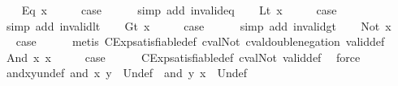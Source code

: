\begin{isabellebody}
\ \ \isamarkupfalse%
\ {\isacharparenleft}Eq\ x{\isacharparenright}\isanewline
\ \ \isamarkupfalse%
\ \isamarkupfalse%
\ {\isacharquery}case\isanewline
\ \ \ \ \isamarkupfalse%
\ {\isacharparenleft}simp\ add{\isacharcolon}\ invalid{\isacharunderscore}eq{\isacharparenright}\isanewline
{}\isamarkupfalse%
\isanewline
\ \ \isamarkupfalse%
\ {\isacharparenleft}Lt\ x{\isacharparenright}\isanewline
\ \ \isamarkupfalse%
\ \isamarkupfalse%
\ {\isacharquery}case\isanewline
\ \ \ \ \isamarkupfalse%
\ {\isacharparenleft}simp\ add{\isacharcolon}\ invalid{\isacharunderscore}lt{\isacharparenright}\isanewline
{}\isamarkupfalse%
\isanewline
\ \ \isamarkupfalse%
\ {\isacharparenleft}Gt\ x{\isacharparenright}\isanewline
\ \ \isamarkupfalse%
\ \isamarkupfalse%
\ {\isacharquery}case\isanewline
\ \ \ \ \isamarkupfalse%
\ {\isacharparenleft}simp\ add{\isacharcolon}\ invalid{\isacharunderscore}gt{\isacharparenright}\isanewline
{}\isamarkupfalse%
\isanewline
\ \ \isamarkupfalse%
\ {\isacharparenleft}Not\ x{\isacharparenright}\isanewline
\ \ \isamarkupfalse%
\ \isamarkupfalse%
\ {\isacharquery}case\isanewline
\ \ \ \ \isamarkupfalse%
\ {\isacharparenleft}metis\ CExp{\isachardot}satisfiable{\isacharunderscore}def\ cval{\isacharunderscore}Not\ cval{\isacharunderscore}double{\isacharunderscore}negation\ valid{\isacharunderscore}def{\isacharparenright}\isanewline
{}\isamarkupfalse%
\isanewline
\ \ \isamarkupfalse%
\ {\isacharparenleft}And\ x{}\ x{}{\isacharparenright}\isanewline
\ \ \isamarkupfalse%
\ \isamarkupfalse%
\ {\isacharquery}case\isanewline
\ \ \ \ \isamarkupfalse%
\ CExp{\isachardot}satisfiable{\isacharunderscore}def\ cval{\isacharunderscore}Not\ valid{\isacharunderscore}def\ \isamarkupfalse%
\ force\isanewline
{}\isamarkupfalse%
%
\endisatagproof
{\isafoldproof}%
%
\isadelimproof
\isanewline
%
\endisadelimproof
\isanewline
{}\isamarkupfalse%
\ and{\isacharunderscore}x{\isacharunderscore}y{\isacharunderscore}undef{\isacharcolon}\ {\isachardoublequoteopen}and\ x\ y\ {\isacharequal}\ Undef\ {\isasymLongrightarrow}\ and\ y\ x\ {\isacharequal}\ Undef{\isachardoublequoteclose}\isanewline
%
\isadelimproof
\ \ %
\endisadelimproof

\end{isabellebody}
